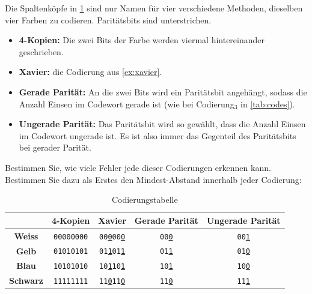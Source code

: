 \begin{myexercise}\label{ex:fehler-kodierungen}
    Die Spaltenköpfe in \cref{tab:kodierung} sind nur Namen für vier verschiedene Methoden, dieselben vier Farben zu codieren. Paritätsbits sind unterstrichen.
    \begin{itemize}
        \item \textbf{4-Kopien:} Die zwei Bits der Farbe werden viermal hintereinander geschrieben.
        \item \textbf{Xavier:} die Codierung aus \cref{ex:xavier}.
        \item \textbf{Gerade Parität:} An die zwei Bits wird ein Paritätsbit angehängt, sodass die Anzahl Einsen im Codewort gerade ist (wie bei Codierung$_3$ in \cref{tab:codes}).
        \item \textbf{Ungerade Parität:} Das Paritätsbit wird so gewählt, dass die Anzahl Einsen im Codewort ungerade ist. Es ist also immer das Gegenteil des Paritätsbits bei gerader Parität.
    \end{itemize}
    Bestimmen Sie, wie viele Fehler jede dieser Codierungen erkennen kann. Bestimmen Sie dazu als Erstes den Mindest-Abstand innerhalb jeder Codierung:
    \begin{table}[H]
        \centering
        \begin{tabular}{ccccc}
                             & \textbf{4-Kopien} & \textbf{Xavier} & \textbf{Gerade Parität} & \textbf{Ungerade Parität} \\
            \midrule
            \textbf{Weiss}   & \texttt{00000000} & \texttt{00\underline{0}00\underline{0}} & \texttt{00\underline{0}}      & \texttt{00\underline{1}}      \\
            \midrule
            \textbf{Gelb}    & \texttt{01010101} & \texttt{01\underline{1}01\underline{1}} & \texttt{01\underline{1}}      & \texttt{01\underline{0}}      \\
            \midrule
            \textbf{Blau}    & \texttt{10101010} & \texttt{10\underline{1}10\underline{1}} & \texttt{10\underline{1}}      & \texttt{10\underline{0}}      \\
            \midrule
            \textbf{Schwarz} & \texttt{11111111} & \texttt{11\underline{0}11\underline{0}} & \texttt{11\underline{0}}      & \texttt{11\underline{1}}      \\
        \end{tabular}
        \caption{Codierungstabelle}
        \label{tab:kodierung}
    \end{table}
    \begin{myanswer}

\end{myanswer}
\end{myexercise}
